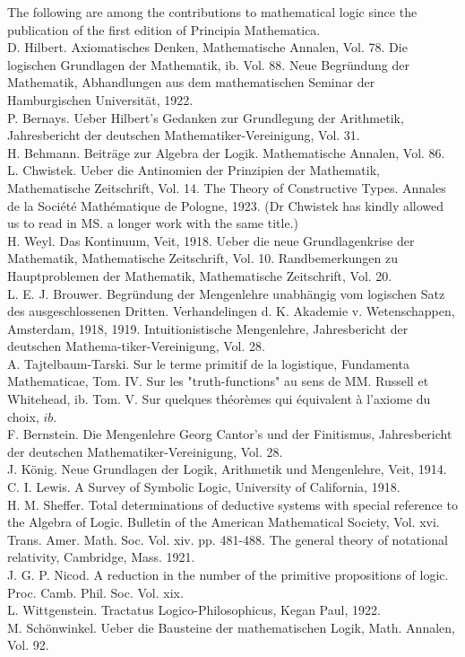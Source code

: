 \documentclass[10pt]{article}
\begin{document}
The following are among the contributions to mathematical logic since the publication of the first edition of Principia Mathematica.\\
D. Hilbert. Axiomatisches Denken, Mathematische Annalen, Vol. 78. Die logischen Grundlagen der Mathematik, ib. Vol. 88. Neue Begründung der Mathematik, Abhandlungen aus dem mathematischen Seminar der Hamburgischen Universität, 1922.\\
P. Bernays. Ueber Hilbert's Gedanken zur Grundlegung der Arithmetik, Jahresbericht der deutschen Mathematiker-Vereinigung, Vol. 31.\\
H. Behmann. Beiträge zur Algebra der Logik. Mathematische Annalen, Vol. 86.\\
L. Chwistek. Ueber die Antinomien der Prinzipien der Mathematik, Mathematische Zeitschrift, Vol. 14. The Theory of Constructive Types. Annales de la Société Mathématique de Pologne, 1923. (Dr Chwistek has kindly allowed us to read in MS. a longer work with the same title.)\\
H. Weyl. Das Kontinuum, Veit, 1918. Ueber die neue Grundlagenkrise der Mathematik, Mathematische Zeitschrift, Vol. 10. Randbemerkungen zu Hauptproblemen der Mathematik, Mathematische Zeitschrift, Vol. 20.\\
L. E. J. Brouwer. Begründung der Mengenlehre unabhängig vom logischen Satz des ausgeschlossenen Dritten. Verhandelingen d. K. Akademie v. Wetenschappen, Amsterdam, 1918, 1919. Intuitionistische Mengenlehre, Jahresbericht der deutschen Mathema-tiker-Vereinigung, Vol. 28.\\
A. Tajtelbaum-Tarski. Sur le terme primitif de la logistique, Fundamenta Mathematicae, Tom. IV. Sur les "truth-functions" au sens de MM. Russell et Whitehead, ib. Tom. V. Sur quelques théorèmes qui équivalent à l'axiome du choix, $i b$.\\
F. Bernstein. Die Mengenlehre Georg Cantor's und der Finitismus, Jahresbericht der deutschen Mathematiker-Vereinigung, Vol. 28.\\
J. König. Neue Grundlagen der Logik, Arithmetik und Mengenlehre, Veit, 1914.\\
C. I. Lewis. A Survey of Symbolic Logic, University of California, 1918.\\
H. M. Sheffer. Total determinations of deductive systems with special reference to the Algebra of Logic. Bulletin of the American Mathematical Society, Vol. xvi. Trans. Amer. Math. Soc. Vol. xiv. pp. 481-488. The general theory of notational relativity, Cambridge, Mass. 1921.\\
J. G. P. Nicod. A reduction in the number of the primitive propositions of logic. Proc. Camb. Phil. Soc. Vol. xix.\\
L. Wittgenstein. Tractatus Logico-Philosophicus, Kegan Paul, 1922.\\
M. Schönwinkel. Ueber die Bausteine der mathematischen Logik, Math. Annalen, Vol. 92.
\end{document}
